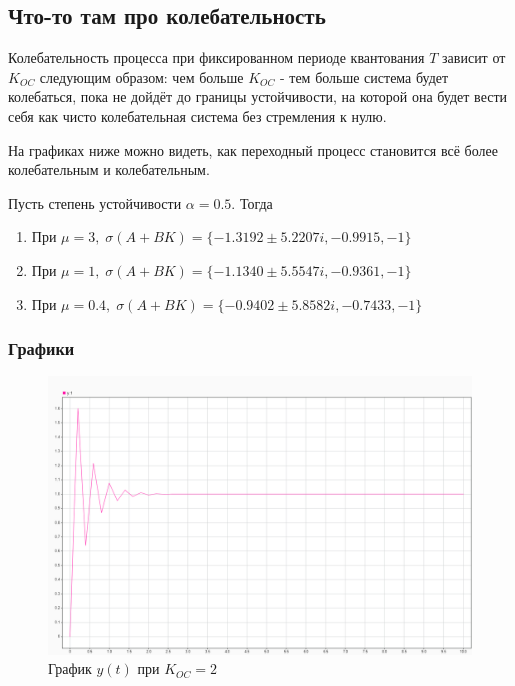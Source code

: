 
\subsection{Что-то там про колебательность}

Колебательность процесса при фиксированном периоде квантования $T$ зависит от $K_{OC}$ следующим образом: чем больше $K_{OC}$ - тем больше система будет колебаться, пока не дойдёт до границы устойчивости, на которой она будет вести себя как чисто колебательная система без стремления к нулю.

На графиках ниже можно видеть, как переходный процесс становится всё более колебательным и колебательным. 

Пусть степень устойчивости $\alpha = 0.5$. Тогда

\begin{enumerate}
    \item При $\mu = 3, \; \sigma(A+BK) = \{  -1.3192 \pm 5.2207i,  -0.9915, -1\}$
    \item При $\mu = 1, \; \sigma(A+BK) = \{  -1.1340 \pm 5.5547i,  -0.9361, -1\}$
    \item При $\mu = 0.4, \; \sigma(A+BK) = \{  -0.9402 \pm 5.8582i,  -0.7433, -1\}$
\end{enumerate}


\subsubsection{Графики}

\begin{figure}[H]
    \centering
\includegraphics[width=1.\linewidth,center]{assets/images/2.png}
    \caption{График $y(t)$ при $K_{OC} = 2$}
    \label{fig:p2}
\end{figure}


